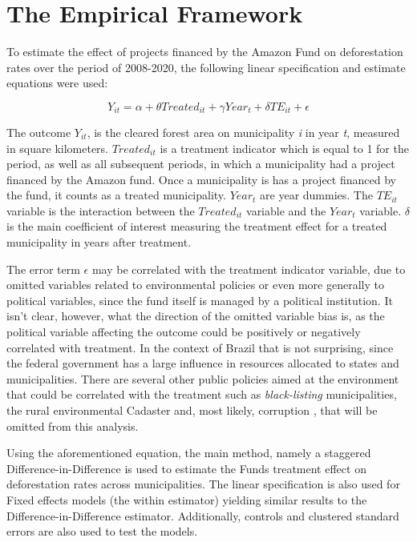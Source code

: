 \documentclass[11pt, oneside]{article}   	%
\begin{document}
\section{The Empirical Framework}

To estimate the effect of projects financed by the Amazon Fund on deforestation rates over the period of 2008-2020, the following linear specification and estimate equations were used: 

\begin{equation} Y_{it} = \alpha + \theta Treated_{it}  + \gamma Year_{t} + \delta TE_{it} + \epsilon
\end{equation}

The outcome $Y_{it}$, is the cleared forest area on municipality \textit{i} in year \textit{t}, measured in square kilometers. $Treated_{it}$  is a treatment indicator which is equal to 1 for the period, as well as all subsequent periods, in which a municipality had a project financed by the Amazon fund. Once a municipality is has a project financed by the fund, it counts as a treated municipality. $Year_{t}$ are year dummies. The $TE_{it}$ variable is the interaction between the $Treated_{it}$ variable and the $Year_{t}$ variable. $\delta$ is the main coefficient of interest measuring the treatment effect for a treated municipality in years after treatment. 

The error term $\epsilon$ may be correlated with the treatment indicator variable, due to omitted variables related to environmental policies or even more generally to political variables, since the fund itself is managed by a political institution. It isn't clear, however, what the direction of the omitted variable bias is, as the political variable affecting the outcome could be positively or negatively correlated with treatment. In the context of Brazil that is not surprising, since the federal government has a large influence in resources allocated to states and municipalities. There are several other public policies aimed at the environment that could be correlated with the treatment such as \textit{black-listing} municipalities, the rural environmental Cadaster \cite{cisneros2015naming} and, most likely, corruption \cite{tersitsch2017impact}, that will be omitted from this analysis. 

Using the aforementioned equation, the main method, namely a staggered Difference-in-Difference is used to estimate the Funds treatment effect on deforestation rates across municipalities. The linear specification is also used for Fixed effects models (the within estimator) yielding similar results to the Difference-in-Difference estimator. Additionally, controls and clustered standard errors are also used to test the models. 
\end{document}
